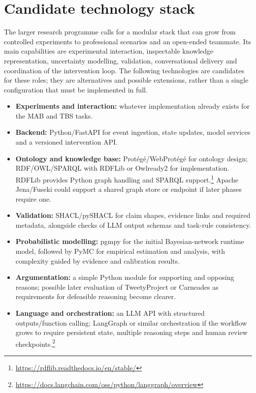 \documentclass[11pt,a4paper]{article}
\begin{document}
\section{Candidate technology stack}
The larger research programme calls for a modular stack that can grow from controlled experiments to professional scenarios and an open-ended teammate. Its main capabilities are experimental interaction, inspectable knowledge representation, uncertainty modelling, validation, conversational delivery and coordination of the intervention loop. The following technologies are candidates for these roles; they are alternatives and possible extensions, rather than a single configuration that must be implemented in full.
\begin{itemize}
\item \textbf{Experiments and interaction:} whatever implementation already exists for the MAB and TBS tasks.
\item \textbf{Backend:} Python/FastAPI for event ingestion, state updates, model services and a versioned intervention API.
\item \textbf{Ontology and knowledge base:} Prot\'eg\'e/WebProt\'eg\'e for ontology design; RDF/OWL/SPARQL with RDFLib or Owlready2 for implementation. RDFLib provides Python graph handling and SPARQL support.\footnote{\url{https://rdflib.readthedocs.io/en/stable/}} Apache Jena/Fuseki could support a shared graph store or endpoint if later phases require one.
\item \textbf{Validation:} SHACL/pySHACL for claim shapes, evidence links and required metadata, alongside checks of LLM output schemas and task-rule consistency.


\item \textbf{Probabilistic modelling:} pgmpy for the initial Bayesian-network runtime model, followed by PyMC for empirical estimation and analysis, with complexity guided by evidence and calibration results.
\item \textbf{Argumentation:} a simple Python module for supporting and opposing reasons; possible later evaluation of TweetyProject or Carneades as requirements for defeasible reasoning become clearer.
\item \textbf{Language and orchestration:} an LLM API with structured outputs/function calling; LangGraph or similar orchestration if the workflow grows to require persistent state, multiple reasoning steps and human review checkpoints.\footnote{\url{https://docs.langchain.com/oss/python/langgraph/overview}}
\end{itemize}
\end{document}
